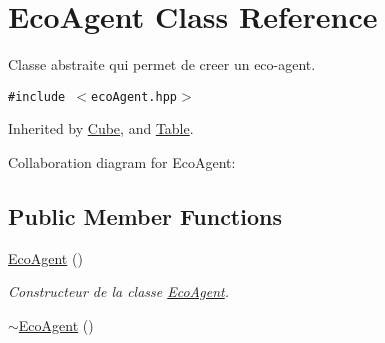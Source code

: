 \hypertarget{classEcoAgent}{
\section{EcoAgent Class Reference}
\label{classEcoAgent}
}
Classe abstraite qui permet de creer un eco-agent.  


{\tt \#include $<$ecoAgent.hpp$>$}

Inherited by \hyperlink{classCube}{Cube}, and \hyperlink{classTable}{Table}.

Collaboration diagram for EcoAgent:\subsection*{Public Member Functions}
\begin{CompactItemize}
\item 
\hyperlink{classEcoAgent_a0d07e98fbbb24b69a7d5d7fc0a75d2b}{EcoAgent} ()
\begin{CompactList}\small\item\em Constructeur de la classe \hyperlink{classEcoAgent}{EcoAgent}. \item\end{CompactList}\item 
\hypertarget{classEcoAgent_9443554bf734013cf26ff34d6bee4bbf}{
\hyperlink{classEcoAgent_9443554bf734013cf26ff34d6bee4bbf}{$\sim$EcoAgent} ()}
\label{classEcoAgent_9443554bf734013cf26ff34d6bee4bbf}


\end{CompactItemize}
